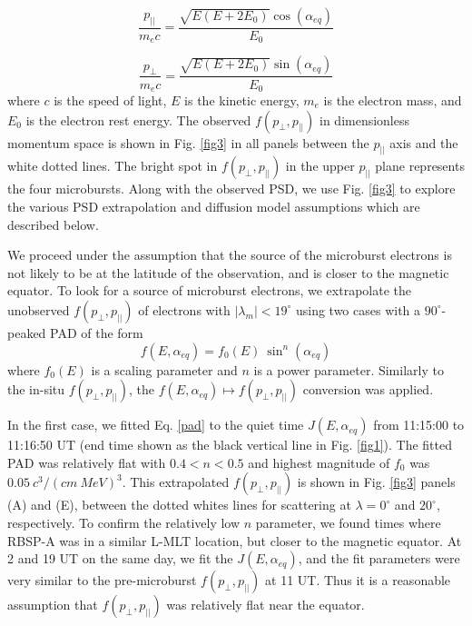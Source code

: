 \begin{equation}
\frac{p_{||}}{m_e c} = \frac{\sqrt{E(E+2E_0)} \cos{(\alpha_{eq})}}{E_0}
\end{equation} 

\begin{equation}
\frac{p_{\perp}}{m_e c} = \frac{\sqrt{E(E+2E_0)} \sin{(\alpha_{eq})}}{E_0}
\end{equation} where $c$ is the speed of light, $E$ is the kinetic energy, $m_e$ is the electron mass, and $E_0$ is the electron rest energy. The observed $f(p_\perp, p_{||})$ in dimensionless momentum space is shown in Fig. \ref{fig3} in all panels between the $p_{||}$ axis and the white dotted lines. The bright spot in $f(p_\perp, p_{||})$ in the upper $p_{||}$ plane represents the four microbursts.  Along with the observed PSD, we use Fig. \ref{fig3} to explore the various PSD extrapolation and diffusion model assumptions which are described below.

We proceed under the assumption that the source of the microburst electrons is not likely to be at the latitude of the observation, and is closer to the magnetic equator. To look for a source of microburst electrons, we extrapolate the unobserved $f(p_\perp, p_{||})$ of electrons with $|\lambda_m| < 19^\circ$ using two cases with a $90^\circ$-peaked PAD of the form
\begin{equation}
f(E, \alpha_{eq}) = f_0(E) \  \sin^n(\alpha_{eq})
\label{pad}
\end{equation} where $f_0(E)$ is a scaling parameter and $n$ is a power parameter. Similarly to the in-situ $f(p_\perp, p_{||})$, the $f(E, \alpha_{eq}) \mapsto f(p_\perp, p_{||})$ conversion was applied. 

In the first case, we fitted Eq. \ref{pad} to the quiet time $J(E, \alpha_{eq})$ from 11:15:00 to 11:16:50 UT (end time shown as the black vertical line in Fig. \ref{fig1}). The fitted PAD was relatively flat with $0.4 < n < 0.5$ and highest magnitude of $f_0$ was $0.05 \ c^3/(cm \ MeV)^3$. This extrapolated $f(p_\perp, p_{||})$ is shown in Fig. \ref{fig3} panels (A) and (E), between the dotted whites lines for scattering at $\lambda = 0^\circ$ and $20^\circ$, respectively. To confirm the relatively low $n$ parameter, we found times where RBSP-A was in a similar L-MLT location, but closer to the magnetic equator. At 2 and 19 UT on the same day, we fit the $J(E, \alpha_{eq})$, and the fit parameters were very similar to the pre-microburst $f(p_\perp, p_{||})$ at 11 UT. Thus it is a reasonable assumption that $f(p_\perp, p_{||})$ was relatively flat near the equator.

